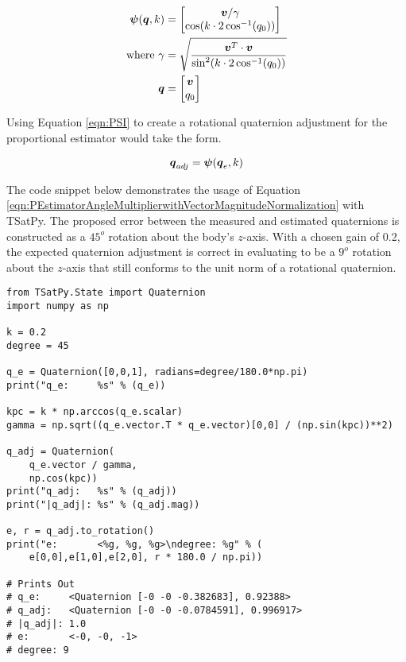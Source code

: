 \begin{equation}
  \begin{aligned}
    \boldsymbol{\psi}(\boldsymbol{q}, k) &= \begin{bmatrix} \boldsymbol{v} / \gamma \\ \cos ( k \cdot 2\cos^{-1} (q_0))  \end{bmatrix} \\
    \text{where } \gamma &= \sqrt{\frac{\boldsymbol{v}^T \cdot \boldsymbol{v}}{\sin^2 ( k \cdot 2\cos^{-1} (q_0))}} \\
    \boldsymbol{q} &= \begin{bmatrix} \boldsymbol{v} \\ q_0  \end{bmatrix}
  \end{aligned}
  \label{eqn:PSI}
\end{equation}

Using Equation \ref{eqn:PSI} to create a rotational quaternion adjustment for the proportional estimator would take the form.

\begin{equation}
  \boldsymbol{q}_{adj} = \boldsymbol{\psi}(\boldsymbol{q}_e, k)
  \label{eqn:PEstimatorAngleMultiplierwithVectorMagnitudeNormalization}
\end{equation}

The code snippet below demonstrates the usage of Equation \ref{eqn:PEstimatorAngleMultiplierwithVectorMagnitudeNormalization} with TSatPy.  The proposed error between the measured and estimated quaternions is constructed as a $45^o$ rotation about the body's $z$-axis.  With a chosen gain of 0.2, the expected quaternion adjustment is correct in evaluating to be a $9^o$ rotation about the $z$-axis that still conforms to the unit norm of a rotational quaternion.

\begin{singlespace}
  \begin{verbatim}
from TSatPy.State import Quaternion
import numpy as np

k = 0.2
degree = 45

q_e = Quaternion([0,0,1], radians=degree/180.0*np.pi)
print("q_e:     %s" % (q_e))

kpc = k * np.arccos(q_e.scalar)
gamma = np.sqrt((q_e.vector.T * q_e.vector)[0,0] / (np.sin(kpc))**2)

q_adj = Quaternion(
    q_e.vector / gamma,
    np.cos(kpc))
print("q_adj:   %s" % (q_adj))
print("|q_adj|: %s" % (q_adj.mag))

e, r = q_adj.to_rotation()
print("e:       <%g, %g, %g>\ndegree: %g" % (
    e[0,0],e[1,0],e[2,0], r * 180.0 / np.pi))

# Prints Out
# q_e:     <Quaternion [-0 -0 -0.382683], 0.92388>
# q_adj:   <Quaternion [-0 -0 -0.0784591], 0.996917>
# |q_adj|: 1.0
# e:       <-0, -0, -1>
# degree: 9
  \end{verbatim}
\nocite{minted}
\end{singlespace}

